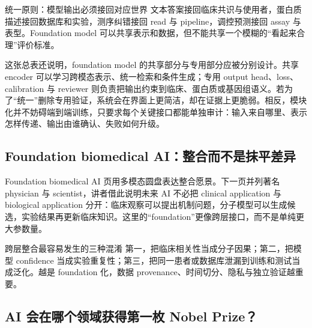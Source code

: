 \begin{importantbox}{统一原则：模型输出必须接回对应世界}
文本答案接回临床共识与使用者，蛋白质描述接回数据库和实验，测序纠错接回 read 与 pipeline，调控预测接回 assay 与表型。Foundation model 可以共享表示和数据，但不能共享一个模糊的“看起来合理”评价标准。
\end{importantbox}

这张总表还说明，foundation model 的共享部分与专用部分应被分别设计。共享 encoder 可以学习跨模态表示、统一检索和条件生成；专用 output head、loss、calibration 与 reviewer 则负责把输出约束到临床、蛋白质或基因组语义。若为了“统一”删除专用验证，系统会在界面上更简洁，却在证据上更脆弱。相反，模块化并不妨碍端到端训练，只要求每个关键接口都能单独审计：输入来自哪里、表示怎样传递、输出由谁确认、失败如何升级。

\subsection{Foundation biomedical AI：整合而不是抹平差异}

Foundation biomedical AI 页用多模态圆盘表达整合愿景。下一页并列著名 physician 与 scientist，讲者借此说明未来 AI 不必把 clinical application 与 biological application 分开：临床观察可以提出机制问题，分子模型可以生成候选，实验结果再更新临床知识。这里的“foundation”更像跨层接口，而不是单纯更大参数量。




\begin{warningbox}{跨层整合最容易发生的三种混淆}
第一，把临床相关性当成分子因果；第二，把模型 confidence 当成实验重复性；第三，把同一患者或数据库泄漏到训练和测试当成泛化。越是 foundation 化，数据 provenance、时间切分、隐私与独立验证越重要。
\end{warningbox}

\subsection{AI 会在哪个领域获得第一枚 Nobel Prize？}

